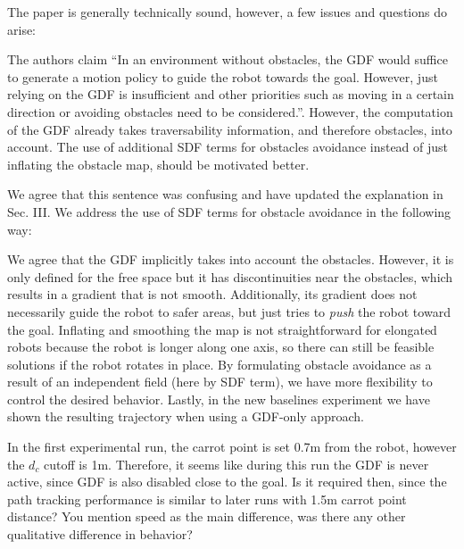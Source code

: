 \documentclass[a4paper,11pt]{article}
\begin{document}
\begin{displayquote}
	The paper is generally technically sound, however, a few issues and
	questions do arise:
	
	The authors claim “In an environment without obstacles, the GDF would
	suffice to generate a motion policy to guide the robot towards the
	goal. However, just relying on the GDF is insufficient and other
	priorities such as moving in a certain direction or avoiding obstacles
	need to be considered.”. However, the computation of the GDF already
	takes traversability information, and therefore obstacles, into
	account. The use of additional SDF terms for obstacles avoidance
	instead of just inflating the obstacle map, should be motivated better. 
\end{displayquote}

We agree that this sentence was confusing and have updated the explanation in Sec. III.
We address the use of SDF terms for obstacle avoidance in the following way:
\begin{outline}[enumerate]
	\1 We agree that the GDF implicitly takes into account the obstacles. 
	However, it is only defined for the free space but it has discontinuities 
	near the obstacles, which results in a gradient that is not smooth.	
	\1 Additionally, its gradient does not necessarily guide the robot 
	to safer areas, but just tries to \emph{push} the robot toward the goal.
	\1 Inflating and smoothing the map is not straightforward for elongated 
	robots because the robot is longer along one axis, so there can still be 
	feasible solutions if the robot rotates in place. 
	\1 By formulating obstacle avoidance as a result of an independent field (here by SDF term), 
	we have more flexibility to control the desired behavior.
	\1 Lastly, in the new baselines experiment we have shown the resulting 
	trajectory when using a GDF-only approach.
\end{outline}

\begin{displayquote}
	In the first experimental run, the carrot point is set 0.7m from the
	robot, however the $d_c$ cutoff is 1m. Therefore, it seems like during
	this run the GDF is never active, since GDF is also disabled close to
	the goal. Is it required then, since the path tracking performance is
	similar to later runs with 1.5m carrot point distance? You mention
	speed as the main difference, was there any other qualitative
	difference in behavior?
\end{displayquote}
\end{document}
